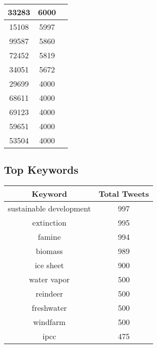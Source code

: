 \documentclass{article}\usepackage[T1]{fontenc}
\begin{document}
\begin{tabular}{|c|c|c|}
 \hline
33283 & 6000\\ 
 \hline
15108 & 5997\\ 
 \hline
99587 & 5860\\ 
 \hline
72452 & 5819\\ 
 \hline
34051 & 5672\\ 
 \hline
29699 & 4000\\ 
 \hline
68611 & 4000\\ 
 \hline
69123 & 4000\\ 
 \hline
59651 & 4000\\ 
 \hline
53504 & 4000\\ 
 \hline
\end{tabular}\subsection*{Top Keywords}\begin{tabular}{|c|c|}         \hline         Keyword & Total Tweets \\ 
 \hline
sustainable development & 997\\ 
 \hline
extinction & 995\\ 
 \hline
famine & 994\\ 
 \hline
biomass & 989\\ 
 \hline
ice sheet & 900\\ 
 \hline
water vapor & 500\\ 
 \hline
reindeer & 500\\ 
 \hline
freshwater & 500\\ 
 \hline
windfarm & 500\\ 
 \hline
ipcc & 475\\ 
 \hline
\end{tabular}
\end{document}
